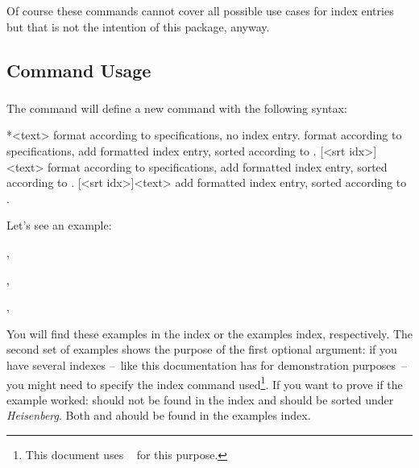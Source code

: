 \documentclass{cnpkgdoc}
\begin{document}
Of course these commands cannot cover all possible use cases for index entries
but that is not the intention of this package, anyway.

\subsection{Command Usage}\label{ssec:command:usage}
\subsubsection{}\label{ssec:command:usage:newidxcmd}
The command  will define a new
command  with the following syntax:
\begin{beschreibung}
 *{<text>}\newline
   format  according to specifications, no index entry.
 \newline
   format  according to specifications, add formatted index entry,
   sorted according to .
 [<srt idx>]{<text>}\newline
   format  according to specifications, add formatted index entry,
   sorted according to .
 [<srt idx>]{<text>}\newline
   add formatted index entry, sorted according to .
\end{beschreibung}

Let's see an example:
\begin{beispiel}
 , 
 
 , 

 , 
\end{beispiel}
You will find these examples in the index or the examples index, respectively.
The second set of examples shows the purpose of the first optional argument: if
you have several indexes --~like this documentation has for demonstration
purposes~-- you might need to specify the index command used\footnote{This
document uses ~\cite{pkg:imakeidx} for this purpose.}. If you
want to prove if the example worked:  should not be
found in the index and  should be sorted under
\emph{Heisenberg}. Both  and  ahould be
found in the examples index.
\end{document}
